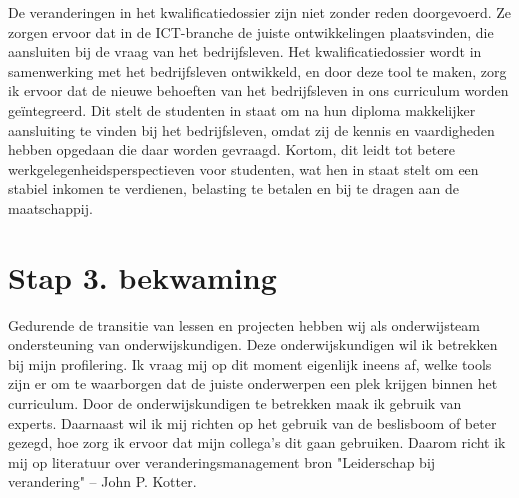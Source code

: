 De veranderingen in het kwalificatiedossier zijn niet zonder reden doorgevoerd. Ze zorgen ervoor dat in de ICT-branche de juiste ontwikkelingen plaatsvinden, die aansluiten bij de vraag van het bedrijfsleven. Het kwalificatiedossier wordt in samenwerking met het bedrijfsleven ontwikkeld, en door deze tool te maken, zorg ik ervoor dat de nieuwe behoeften van het bedrijfsleven in ons curriculum worden geïntegreerd. Dit stelt de studenten in staat om na hun diploma makkelijker aansluiting te vinden bij het bedrijfsleven, omdat zij de kennis en vaardigheden hebben opgedaan die daar worden gevraagd. Kortom, dit leidt tot betere werkgelegenheidsperspectieven voor studenten, wat hen in staat stelt om een stabiel inkomen te verdienen, belasting te betalen en bij te dragen aan de maatschappij.

\section{Stap 3. bekwaming}
Gedurende de transitie van lessen en projecten hebben wij als onderwijsteam ondersteuning van onderwijskundigen. Deze onderwijskundigen wil ik betrekken bij mijn profilering. Ik vraag mij op dit moment eigenlijk ineens af, welke tools zijn er om te waarborgen dat de juiste onderwerpen een plek krijgen binnen het curriculum. Door de onderwijskundigen te betrekken maak ik gebruik van experts. Daarnaast wil ik mij richten op het gebruik van de beslisboom of beter gezegd, hoe zorg ik ervoor dat mijn collega's dit gaan gebruiken. Daarom richt ik mij op literatuur over veranderingsmanagement {bron "Leiderschap bij verandering" – John P. Kotter}. 